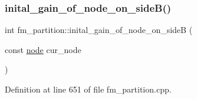 \subsubsection{\texorpdfstring{inital\+\_\+gain\+\_\+of\+\_\+node\+\_\+on\+\_\+side\+B()}{inital\_gain\_of\_node\_on\_sideB()}}
{\footnotesize\ttfamily int fm\+\_\+partition\+::inital\+\_\+gain\+\_\+of\+\_\+node\+\_\+on\+\_\+sideB (\begin{DoxyParamCaption}\item[{const \mbox{\hyperlink{classnode}{node}}}]{cur\+\_\+node }\end{DoxyParamCaption})\hspace{0.3cm}{\ttfamily [protected]}}



Definition at line 651 of file fm\+\_\+partition.\+cpp.


